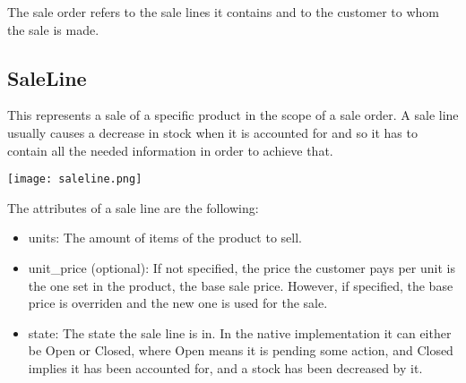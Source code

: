 The sale order refers to the sale lines it contains and to the customer to whom the sale is made.

\subsection{SaleLine}
This represents a sale of a specific product in the scope of a sale order. A sale line usually causes a decrease in stock when it is accounted for and so it has to contain all the needed information in order to achieve that.
\begin{center}
\texttt{[image: saleline.png]}
\end{center}
The attributes of a sale line are the following:

\begin{itemize}
\item units: The amount of items of the product to sell.
\item unit\_price (optional): If not specified, the price the customer pays per unit is the one set in the product, the base sale price. However, if specified, the base price is overriden and the new one is used for the sale.
\item state: The state the sale line is in. In the native implementation it can either be Open or Closed, where Open means it is pending some action, and Closed implies it has been accounted for, and a stock has been decreased by it.
\end{itemize}